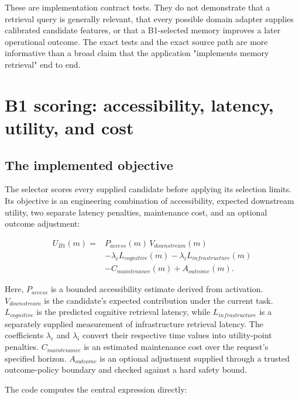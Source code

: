 These are implementation contract tests. They do not demonstrate that a retrieval query is generally relevant, that every possible domain adapter supplies calibrated candidate features, or that a B1-selected memory improves a later operational outcome. The exact tests and the exact source path are more informative than a broad claim that the application "implements memory retrieval" end to end.

\section{B1 scoring: accessibility, latency, utility, and cost}
\label{sec:ch21-b1-scoring}

\subsection{The implemented objective}
\label{subsec:ch21-b1-objective}

The selector scores every supplied candidate before applying its selection limits. Its objective is an engineering combination of accessibility, expected downstream utility, two separate latency penalties, maintenance cost, and an optional outcome adjustment:

\[
\begin{aligned}
U_{B1}(m) ={}& P_{access}(m)\,V_{downstream}(m) \\
&- \lambda_c L_{cognitive}(m)
- \lambda_i L_{infrastructure}(m) \\
&- C_{maintenance}(m) + A_{outcome}(m).
\end{aligned}
\]

Here, \(P_{access}\) is a bounded accessibility estimate derived from activation. \(V_{downstream}\) is the candidate's expected contribution under the current task. \(L_{cognitive}\) is the predicted cognitive retrieval latency, while \(L_{infrastructure}\) is a separately supplied measurement of infrastructure retrieval latency. The coefficients \(\lambda_c\) and \(\lambda_i\) convert their respective time values into utility-point penalties. \(C_{maintenance}\) is an estimated maintenance cost over the request's specified horizon. \(A_{outcome}\) is an optional adjustment supplied through a trusted outcome-policy boundary and checked against a hard safety bound.

The code computes the central expression directly:

